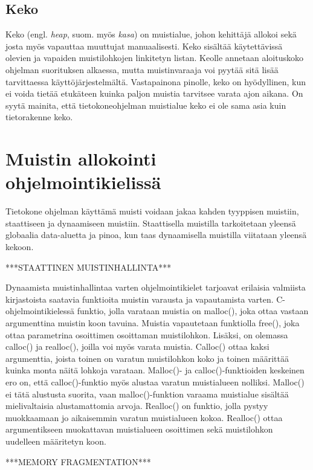 \subsection{Keko}

Keko (engl. \textit{heap}, suom. myös \textit{kasa}) on muistialue, johon kehittäjä allokoi sekä josta myös vapauttaa muuttujat manuaalisesti. Keko sisältää käytettävissä olevien ja vapaiden muistilohkojen linkitetyn listan. Keolle annetaan aloituskoko ohjelman suorituksen alkaessa, mutta muistinvaraaja voi pyytää sitä lisää tarvittaessa käyttöjärjestelmältä. Vastapainona pinolle, keko on hyödyllinen, kun ei voida tietää etukäteen kuinka paljon muistia tarvitsee varata ajon aikana.\cite{mmic2010} On syytä mainita, että tietokoneohjelman muistialue keko ei ole sama asia kuin tietorakenne keko.

\section{Muistin allokointi ohjelmointikielissä}

Tietokone ohjelman käyttämä muisti voidaan jakaa kahden tyyppisen muistiin, staattiseen ja dynaamiseen muistiin. Staattisella muistilla tarkoitetaan yleensä globaalia data-aluetta ja pinoa, kun taas dynaamisella muistilla viitataan yleensä kekoon.\cite{ddm2015book}

***STAATTINEN MUISTINHALLINTA***

Dynaamista muistinhallintaa varten ohjelmointikielet tarjoavat erilaisia valmiista kirjastoista saatavia funktioita muistin varausta ja vapautamista varten. C-ohjelmointikielessä funktio, jolla varataan muistia on malloc(), joka ottaa vastaan argumenttina muistin koon tavuina. Muistia vapautetaan funktiolla free(), joka ottaa parametrina osoittimen osoittaman muistilohkon. Lisäksi, on olemassa calloc() ja realloc(), joilla voi myös varata muistia. Calloc() ottaa kaksi argumenttia, joista toinen on varatun muistilohkon koko ja toinen määrittää kuinka monta näitä lohkoja varataan. Malloc()- ja calloc()-funktioiden keskeinen ero on, että calloc()-funktio myös alustaa varatun muistialueen nolliksi. Malloc() ei tätä alustusta suorita, vaan malloc()-funktion varaama muistialue sisältää mielivaltaisia alustamattomia arvoja. Realloc() on funktio, jolla pystyy muokkaamaan jo aikaisemmin varatun muistialueen kokoa. Realloc() ottaa argumentikseen muokattavan muistialueen osoittimen sekä muistilohkon uudelleen määritetyn koon.\cite{c2015book}

***MEMORY FRAGMENTATION***

